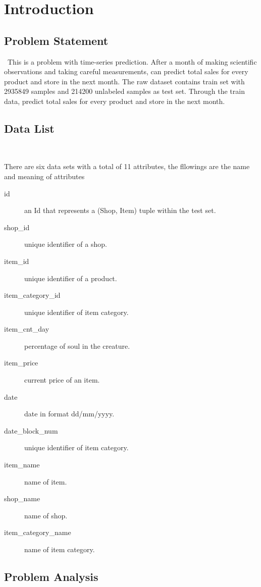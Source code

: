 
\section{Introduction}\label{sec-intro}

\subsection{Problem Statement}
\
This is a problem with time-series prediction.
After a month of making scientific observations 
and taking careful measurements, 
can predict total sales for every product and store in the next month.
The raw dataset contains train set with 2935849 
samples and 214200 unlabeled samples as test set.
Through the train data, predict total sales for every product and store in the 
next month.


\subsection{Data List}
\

There are six data sets with a total of 11 attributes,
the fllowings are the  
name and meaning of attributes


\begin{description}
	\item[id]  an Id that represents a (Shop, Item) tuple within the test set.
	\item[shop\_id] unique identifier of a shop.
	\item[item\_id] unique identifier of a product.
	\item[item\_category\_id] unique identifier of item category.
	\item[item\_cnt\_day] percentage of soul in the creature.
	\item[item\_price] current price of an item.
	\item[date] date in format dd/mm/yyyy.
	\item[date\_block\_num] unique identifier of item category.
	\item[item\_name] name of item.
	\item[shop\_name] name of shop.
	\item[item\_category\_name] name of item category.
\end{description}


\subsection{Problem Analysis}

